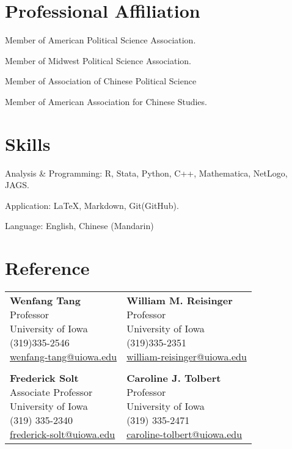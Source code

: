 \documentclass[10.5pt,]{article}
\providecommand{\tightlist}{%
  \setlength{\itemsep}{0pt}\setlength{\parskip}{0pt}}
\renewenvironment{itemize}{
  \begin{list}{}{
    \setlength{\leftmargin}{1.5em}
  }
}{
  \end{list}
}
\begin{document}
\section{Professional Affiliation}\label{professional-affiliation}

\begin{itemize}
\tightlist
\item
  Member of American Political Science Association.
\item
  Member of Midwest Political Science Association.
\item
  Member of Association of Chinese Political Science
\item
  Member of American Association for Chinese Studies.
\end{itemize}

\section{Skills}\label{skills}

\begin{itemize}
\tightlist
\item
  Analysis \& Programming: R, Stata, Python, C++, Mathematica, NetLogo,
  JAGS.
\item
  Application: \LaTeX, Markdown, Git(GitHub).
\item
  Language: English, Chinese (Mandarin)
\end{itemize}

\section{Reference}\label{reference}

\begin{tabular}{ll}
\parbox{5cm}{\textbf{Wenfang Tang}\\Professor\\University of Iowa\\(319)335-2546\\\href{mailto:wenfang-tang@uiowa.edu}{wenfang-tang@uiowa.edu}}
 &\parbox{5cm}{\textbf{William M. Reisinger}\\Professor\\University of Iowa\\(319)335-2351\\\href{mailto:william-reisinger@uiowa.edu}{william-reisinger@uiowa.edu}}\\
&\\
\parbox{5cm}{\textbf{Frederick Solt}\\Associate Professor\\University of Iowa\\(319) 335-2340\\\href{mailto:frederick-solt@uiowa.edu}{frederick-solt@uiowa.edu}}
 &\parbox{5cm}{\textbf{Caroline J. Tolbert}\\Professor\\University of Iowa\\(319) 335-2471\\\href{caroline-tolbert@uiowa.edu}{caroline-tolbert@uiowa.edu}}\\
\end{tabular}
\end{document}
